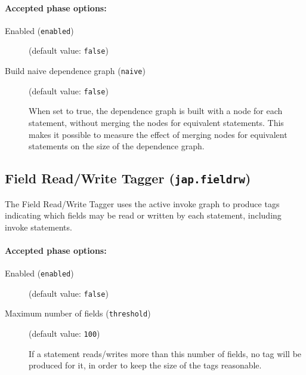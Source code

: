 \documentclass{article}
\begin{document}
\paragraph{Accepted phase options:} 

\begin{description}

\item[Enabled ({\tt enabled})]
(default value: {\tt false})






\item[Build naive dependence graph ({\tt naive})]
(default value: {\tt false})





\par

When set to true, the dependence graph is built with a node for
each statement, without merging the nodes for equivalent
statements. This makes it possible to measure the effect of
merging nodes for equivalent statements on the size of the
dependence graph.



\end{description}

\subsection{Field Read/Write Tagger ({\tt jap.fieldrw})}


\par

The Field Read/Write Tagger uses the active invoke graph to
produce tags indicating which fields may be read or written by
each statement, including invoke statements.


\paragraph{Accepted phase options:} 

\begin{description}

\item[Enabled ({\tt enabled})]
(default value: {\tt false})






\item[Maximum number of fields ({\tt threshold})]
(default value: {\tt 100})




If a statement reads/writes more than this number of fields, no tag will be
produced for it, in order to keep the size of the tags reasonable.
                        


\end{description}
\end{document}
